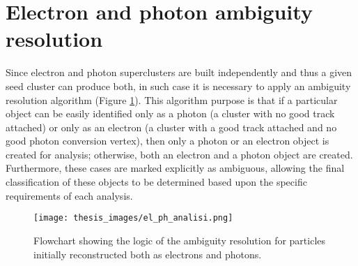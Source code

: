 \documentclass[a4paper, oneside, 11pt, openright]{book}
\begin{document}
		\section{Electron and photon ambiguity resolution}
			Since electron and photon superclusters are built independently and thus a given seed cluster can produce both, in such case it is necessary to apply an ambiguity resolution algorithm (Figure \ref{fig:e_ph_alg}). This algorithm purpose is that if a particular object can be easily identified only as a photon (a cluster with no good track attached) or only as an electron (a cluster with a good track attached and no good photon conversion vertex), then only a photon or an electron object is created for analysis; otherwise, both an electron and a photon object are created. Furthermore, these cases are marked explicitly as ambiguous, allowing the final classification of these objects to be determined based upon the specific requirements of each analysis.
			\begin{figure}
				\centering
				\texttt{[image: thesis\_images/el\_ph\_analisi.png]}
				\caption{Flowchart showing the logic of the ambiguity resolution for particles initially reconstructed both as electrons and photons.}
				\label{fig:e_ph_alg}
			\end{figure}
		
\end{document}
